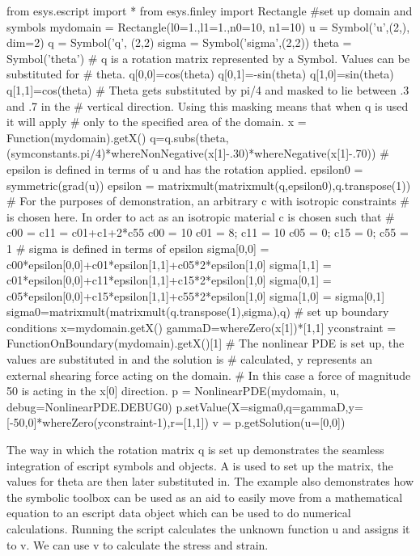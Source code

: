 \begin{python}
from esys.escript import *
from esys.finley import Rectangle
#set up domain and symbols
mydomain = Rectangle(l0=1.,l1=1.,n0=10, n1=10)
u = Symbol('u',(2,), dim=2)
q = Symbol('q', (2,2)
sigma = Symbol('sigma',(2,2))
theta = Symbol('theta')
# q is a rotation matrix represented by a Symbol. Values can be substituted for 
# theta.
q[0,0]=cos(theta)
q[0,1]=-sin(theta)
q[1,0]=sin(theta)
q[1,1]=cos(theta)
# Theta gets substituted by pi/4 and masked to lie between .3 and .7 in the 
# vertical direction. Using this masking means that when q is used it will apply
# only to the specified area of the domain. 
x = Function(mydomain).getX()
q=q.subs(theta,(symconstants.pi/4)*whereNonNegative(x[1]-.30)*whereNegative(x[1]-.70))
# epsilon is defined in terms of u and has the rotation applied. 
epsilon0 = symmetric(grad(u))
epsilon = matrixmult(matrixmult(q,epsilon0),q.transpose(1))
# For the purposes of demonstration, an arbitrary c with isotropic constraints 
# is chosen here. In order to act as an isotropic material c is chosen such that 
# c00 = c11 = c01+c1+2*c55
c00 = 10
c01 = 8; c11 = 10
c05 = 0; c15 = 0; c55 = 1
# sigma is defined in terms of epsilon
sigma[0,0] = c00*epsilon[0,0]+c01*epsilon[1,1]+c05*2*epsilon[1,0]
sigma[1,1] = c01*epsilon[0,0]+c11*epsilon[1,1]+c15*2*epsilon[1,0]
sigma[0,1] = c05*epsilon[0,0]+c15*epsilon[1,1]+c55*2*epsilon[1,0]
sigma[1,0] = sigma[0,1]
sigma0=matrixmult(matrixmult(q.transpose(1),sigma),q)
# set up boundary conditions
x=mydomain.getX()
gammaD=whereZero(x[1])*[1,1]
yconstraint = FunctionOnBoundary(mydomain).getX()[1]
# The nonlinear PDE is set up, the values are substituted in and the solution is
# calculated, y represents an external shearing force acting on the domain. 
# In this case a force of magnitude 50 is acting in the x[0] direction.
p = NonlinearPDE(mydomain, u, debug=NonlinearPDE.DEBUG0)
p.setValue(X=sigma0,q=gammaD,y=[-50,0]*whereZero(yconstraint-1),r=[1,1])
v = p.getSolution(u=[0,0])
\end{python}
The way in which the rotation matrix q is set up demonstrates the seamless integration of escript symbols and \Data objects. A \SYMBOL is used to set up the matrix, the values for theta are then later substituted in. The example also demonstrates how the symbolic toolbox can be used as an aid to easily move from a mathematical equation to an escript data object which can be used to do numerical calculations. 
Running the script calculates the unknown function u and assigns it to v. We can use v to calculate the stress and strain.  
